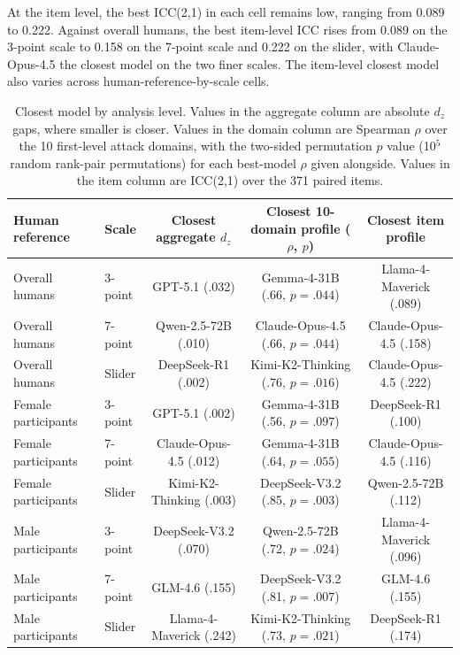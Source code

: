 \documentclass[a4paper,fleqn,review,longmktitle]{cas-sc}
\begin{document}
At the item level, the best ICC(2,1) in each cell remains low, ranging from 0.089 to 0.222. Against overall humans, the best item-level ICC rises from 0.089 on the 3-point scale to 0.158 on the 7-point scale and 0.222 on the slider, with Claude-Opus-4.5 the closest model on the two finer scales. The item-level closest model also varies across human-reference-by-scale cells.

\begin{table}[t]
  \centering
  \scriptsize
  \setlength{\tabcolsep}{3.2pt}
  \begin{tabular}{llccc}
    \toprule
    Human reference & Scale & Closest aggregate $d_z$ & Closest 10-domain profile ($\rho$, $p$) & Closest item profile \\
    \midrule
    Overall humans & 3-point & GPT-5.1 (.032) & Gemma-4-31B (.66, $p=.044$) & Llama-4-Maverick (.089) \\
    Overall humans & 7-point & Qwen-2.5-72B (.010) & Claude-Opus-4.5 (.66, $p=.044$) & Claude-Opus-4.5 (.158) \\
    Overall humans & Slider & DeepSeek-R1 (.002) & Kimi-K2-Thinking (.76, $p=.016$) & Claude-Opus-4.5 (.222) \\
    Female participants & 3-point & GPT-5.1 (.002) & Gemma-4-31B (.56, $p=.097$) & DeepSeek-R1 (.100) \\
    Female participants & 7-point & Claude-Opus-4.5 (.012) & Gemma-4-31B (.64, $p=.055$) & Claude-Opus-4.5 (.116) \\
    Female participants & Slider & Kimi-K2-Thinking (.003) & DeepSeek-V3.2 (.85, $p=.003$) & Qwen-2.5-72B (.112) \\
    Male participants & 3-point & DeepSeek-V3.2 (.070) & Qwen-2.5-72B (.72, $p=.024$) & Llama-4-Maverick (.096) \\
    Male participants & 7-point & GLM-4.6 (.155) & DeepSeek-V3.2 (.81, $p=.007$) & GLM-4.6 (.155) \\
    Male participants & Slider & Llama-4-Maverick (.242) & Kimi-K2-Thinking (.73, $p=.021$) & DeepSeek-R1 (.174) \\
    \bottomrule
  \end{tabular}
  \caption{Closest model by analysis level. Values in the aggregate column are absolute $d_z$ gaps, where smaller is closer. Values in the domain column are Spearman $\rho$ over the 10 first-level attack domains, with the two-sided permutation $p$ value (10$^{5}$ random rank-pair permutations) for each best-model $\rho$ given alongside. Values in the item column are ICC(2,1) over the 371 paired items.}
  \label{tab:multilevel-top-models}
\end{table}
\end{document}
